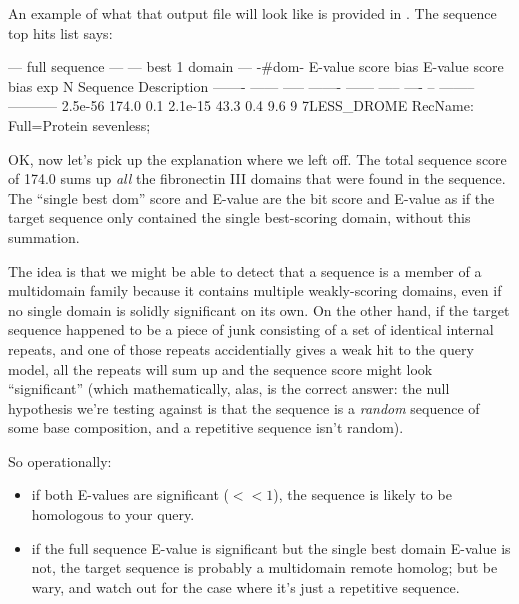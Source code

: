 An example of what that output file will look like is provided in
. The sequence top hits list says:

\begin{sreoutput}
 --- full sequence ---   --- best 1 domain ---    -#dom-
  E-value  score  bias    E-value  score  bias    exp  N  Sequence    Description
  ------- ------ -----    ------- ------ -----   ---- --  --------    -----------
  2.5e-56  174.0   0.1    2.1e-15   43.3   0.4    9.6  9  7LESS_DROME RecName: Full=Protein sevenless; 
\end{sreoutput}

OK, now let's pick up the explanation where we left off. The total
sequence score of 174.0 sums up \emph{all} the fibronectin III domains
that were found in the  sequence. The ``single best
dom'' score and E-value are the bit score and E-value as if the target
sequence only contained the single best-scoring domain, without this
summation.

The idea is that we might be able to detect that a sequence is a
member of a multidomain family because it contains multiple
weakly-scoring domains, even if no single domain is solidly
significant on its own.  On the other hand, if the target sequence
happened to be a piece of junk consisting of a set of identical
internal repeats, and one of those repeats accidentially gives a weak
hit to the query model, all the repeats will sum up and the sequence
score might look ``significant'' (which mathematically, alas, is the
correct answer: the null hypothesis we're testing against is that the
sequence is a \emph{random} sequence of some base composition, and a
repetitive sequence isn't random).

So operationally:
\begin{itemize}
\item if both E-values are significant ($<<1$), the sequence is likely
      to be homologous to your query.
\item if the full sequence E-value is significant but the single best domain
      E-value is not, the target sequence is probably a multidomain remote 
      homolog; but be wary, and watch out for the case where it's just a repetitive
      sequence.
\end{itemize}

